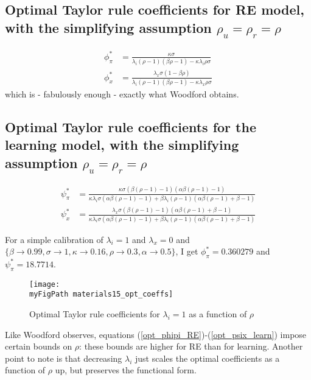 \documentclass[11pt]{article}
\def \myFigPath {../figures/}
\renewcommand{\[}{\begin{equation}}
\renewcommand{\]}{\end{equation}}
\begin{document}
\newpage
\subsection{Optimal Taylor rule coefficients for RE model, with the simplifying assumption $\rho_u = \rho_r = \rho$}
\begin{align}
\phi_{\pi}^* & = \frac{\kappa  \sigma }{\lambda_i(\rho -1) (\beta  \rho -1)-\kappa  \lambda_i \rho  \sigma } \label{opt_phipi_RE}
\\
\phi_{x}^* & =  \frac{\lambda_x\sigma  (1-\beta  \rho )}{\lambda_i (\rho -1) (\beta  \rho -1)-\kappa  \lambda_x \rho  \sigma } \label{opt_phix_RE}
\end{align}
which is - fabulously enough - exactly what Woodford obtains.
\subsection{Optimal Taylor rule coefficients for the learning model, with the simplifying assumption $\rho_u = \rho_r = \rho$}
\begin{align}
\psi_{\pi}^* & =
\frac{\kappa  \sigma  (\beta  (\rho -1)-1) (\alpha  \beta  (\rho -1)-1)}{\kappa  \lambda_i \sigma  (\alpha  \beta  (\rho -1)-1)+\beta  \lambda_i (\rho -1) (\alpha  \beta  (\rho -1)+\beta -1)} \label{opt_psipi_learn} \\
\psi_{x}^* & = 
\frac{\lambda_x\sigma  (\beta  (\rho -1)-1) (\alpha  \beta  (\rho -1)+\beta -1)}{\kappa  \lambda_i \sigma  (\alpha  \beta  (\rho -1)-1)+\beta  \lambda_i (\rho -1) (\alpha  \beta  (\rho -1)+\beta -1)} \label{opt_psix_learn}
\end{align}

For a simple calibration of $\lambda_i =1$ and $\lambda_x=0$ and
$\{\beta \to 0.99,\sigma \to 1,\kappa \to 0.16,\rho \to 0.3,\alpha \to 0.5\}$, I get $\phi_{\pi}^*=0.360279$ and $\psi_{\pi}^*=18.7714$.

\begin{figure}[h!]
\texttt{[image: \\myFigPath materials15\_opt\_coeffs]}
\caption{Optimal Taylor rule coefficients for $\lambda_i = 1$ as a function of $\rho$}
\end{figure}

Like Woodford observes, equations (\ref{opt_phipi_RE})-(\ref{opt_psix_learn}) impose certain bounds on $\rho$: these bounds are higher for RE than for learning. Another point to note is that decreasing $\lambda_i$ just scales the optimal coefficients as a function of $\rho$ up, but preserves the functional form.
\end{document}
